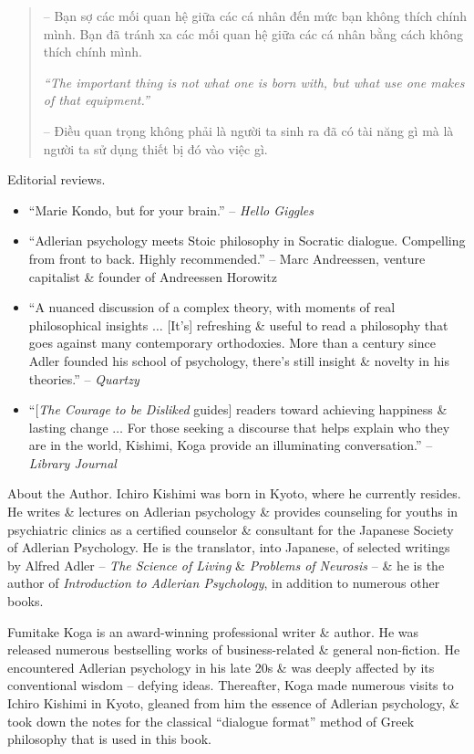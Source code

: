 \documentclass{article}
\begin{document}
\begin{enumerate}
\begin{quotation}
		-- Bạn sợ các mối quan hệ giữa các cá nhân đến mức bạn không thích chính mình. Bạn đã tránh xa các mối quan hệ giữa các cá nhân bằng cách không thích chính mình.
		
		{\it``The important thing is not what one is born with, but what use one makes of that equipment.''}
		
		-- Điều quan trọng không phải là người ta sinh ra đã có tài năng gì mà là người ta sử dụng thiết bị đó vào việc gì.
	\end{quotation}
	{\sf Editorial reviews.}
	\begin{itemize}
		\item ``{\sc Marie Kondo}, but for your brain.'' -- {\it Hello Giggles}
		\item ``Adlerian psychology meets Stoic philosophy in Socratic dialogue. Compelling from front to back. Highly recommended.'' -- {\sc Marc Andreessen}, venture capitalist \& founder of Andreessen Horowitz
		\item ``A nuanced discussion of a complex theory, with moments of real philosophical insights $\ldots$ [It's] refreshing \& useful to read a philosophy that goes against many contemporary orthodoxies. More than a century since {\sc Adler} founded his school of psychology, there's still insight \& novelty in his theories.'' -- {\it Quartzy}
		\item ``[{\it The Courage to be Disliked} guides] readers toward achieving happiness \& lasting change $\ldots$ For those seeking a discourse that helps explain who they are in the world, {\sc Kishimi, Koga} provide an illuminating conversation.'' -- {\it Library Journal}
	\end{itemize}
	{\sf About the Author.} {\sc Ichiro Kishimi} was born in Kyoto, where he currently resides. He writes \& lectures on Adlerian psychology \& provides counseling for youths in psychiatric clinics as a certified counselor \& consultant for the Japanese Society of Adlerian Psychology. He is the translator, into Japanese, of selected writings by {\sc Alfred Adler} -- {\it The Science of Living} \& {\it Problems of Neurosis} -- \& he is the author of {\it Introduction to Adlerian Psychology}, in addition to numerous other books.
	
	{\sc Fumitake Koga} is an award-winning professional writer \& author. He was released numerous bestselling works of business-related \& general non-fiction. He encountered Adlerian psychology in his late 20s \& was deeply affected by its conventional wisdom -- defying ideas. Thereafter, {\sc Koga} made numerous visits to {\sc Ichiro Kishimi} in Kyoto, gleaned from him the essence of Adlerian psychology, \& took down the notes for the classical ``dialogue format'' method of Greek philosophy that is used in this book.
	

\end{enumerate}
\end{document}
